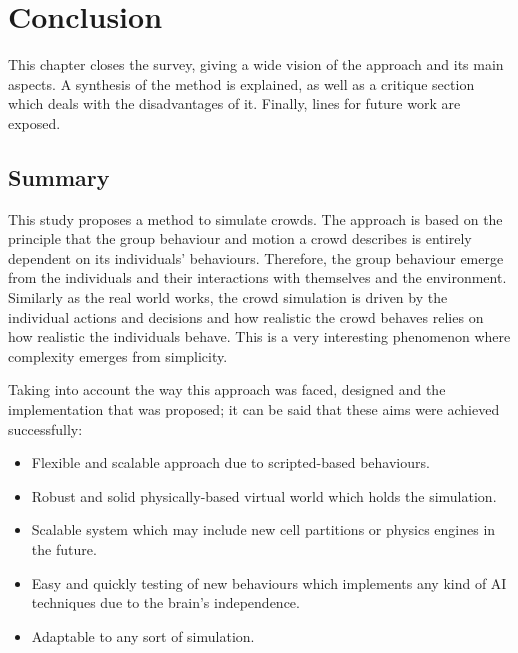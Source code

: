 
\ifx\isEmbedded\undefined

\graphicspath{{../img/}}

\fi

\chapter{Conclusion}
\label{chap:conclusion}

This chapter closes the survey, giving a wide vision of the approach and its main aspects. A synthesis of the method is explained, as well as a critique section which deals with the disadvantages of it. Finally, lines for future work are exposed.

\section{Summary}

This study proposes a method to simulate crowds. The approach is based on the principle that the group behaviour and motion a crowd describes is entirely dependent on its individuals' behaviours. Therefore, the group behaviour emerge from the individuals and their interactions with themselves and the environment. Similarly as the real world works, the crowd simulation is driven by the individual actions and decisions and how realistic the crowd behaves relies on how realistic the individuals behave. This is a very interesting phenomenon where complexity emerges from simplicity.

Taking into account the way this approach was faced, designed and the implementation that was proposed; it can be said that these aims were achieved successfully:

\begin{itemize}
\item Flexible and scalable approach due to scripted-based behaviours.
\item Robust and solid physically-based virtual world which holds the simulation.
\item Scalable system which may include new cell partitions or physics engines in the future.
\item Easy and quickly testing of new behaviours which implements any kind of AI techniques due to the brain's independence.
\item Adaptable to any sort of simulation.
\end{itemize}

